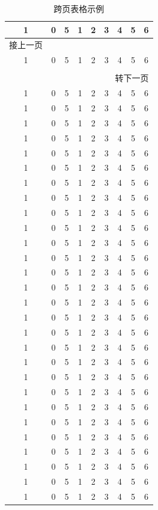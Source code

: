 {\centering
  \begin{longtable}{ccccccccc}
  \caption{跨页表格示例} \\
  \toprule
  1     & 0 & 5  & 1  & 2  & 3  & 4  &  5 & 6 \\
  \midrule
  \endfirsthead

  \multicolumn{1}{l}{接上一页} \\
  \toprule
  1     & 0 & 5  & 1  & 2  & 3  & 4  &  5 & 6 \\
  \midrule
  \endhead

  \bottomrule
  \hline \\
  \multicolumn{9}{r}{{转下一页}} \\
  \endfoot

  \bottomrule
  \endlastfoot    

  1     & 0 & 5  & 1  & 2  & 3  & 4  &  5 & 6 \\
  1     & 0 & 5  & 1  & 2  & 3  & 4  &  5 & 6 \\
  1     & 0 & 5  & 1  & 2  & 3  & 4  &  5 & 6 \\
  1     & 0 & 5  & 1  & 2  & 3  & 4  &  5 & 6 \\
  1     & 0 & 5  & 1  & 2  & 3  & 4  &  5 & 6 \\
  1     & 0 & 5  & 1  & 2  & 3  & 4  &  5 & 6 \\
  1     & 0 & 5  & 1  & 2  & 3  & 4  &  5 & 6 \\
  1     & 0 & 5  & 1  & 2  & 3  & 4  &  5 & 6 \\
  1     & 0 & 5  & 1  & 2  & 3  & 4  &  5 & 6 \\
  1     & 0 & 5  & 1  & 2  & 3  & 4  &  5 & 6 \\
  1     & 0 & 5  & 1  & 2  & 3  & 4  &  5 & 6 \\
  1     & 0 & 5  & 1  & 2  & 3  & 4  &  5 & 6 \\
  1     & 0 & 5  & 1  & 2  & 3  & 4  &  5 & 6 \\
  1     & 0 & 5  & 1  & 2  & 3  & 4  &  5 & 6 \\
  1     & 0 & 5  & 1  & 2  & 3  & 4  &  5 & 6 \\
  1     & 0 & 5  & 1  & 2  & 3  & 4  &  5 & 6 \\
  1     & 0 & 5  & 1  & 2  & 3  & 4  &  5 & 6 \\
  1     & 0 & 5  & 1  & 2  & 3  & 4  &  5 & 6 \\
  1     & 0 & 5  & 1  & 2  & 3  & 4  &  5 & 6 \\
  1     & 0 & 5  & 1  & 2  & 3  & 4  &  5 & 6 \\
  1     & 0 & 5  & 1  & 2  & 3  & 4  &  5 & 6 \\
  1     & 0 & 5  & 1  & 2  & 3  & 4  &  5 & 6 \\
  1     & 0 & 5  & 1  & 2  & 3  & 4  &  5 & 6 \\
  1     & 0 & 5  & 1  & 2  & 3  & 4  &  5 & 6 \\
  1     & 0 & 5  & 1  & 2  & 3  & 4  &  5 & 6 \\
  1     & 0 & 5  & 1  & 2  & 3  & 4  &  5 & 6 \\
  1     & 0 & 5  & 1  & 2  & 3  & 4  &  5 & 6 \\
  1     & 0 & 5  & 1  & 2  & 3  & 4  &  5 & 6 \\


\end{longtable}}
